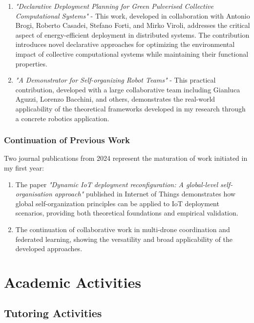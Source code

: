 \documentclass[runningheads]{llncs}
\begin{document}
\begin{enumerate}
\item \textit{"Declarative Deployment Planning for Green Pulverised Collective Computational Systems"} - This work, developed in collaboration with Antonio Brogi, Roberto Casadei, Stefano Forti, and Mirko Viroli, addresses the critical aspect of energy-efficient deployment in distributed systems. The contribution introduces novel declarative approaches for optimizing the environmental impact of collective computational systems while maintaining their functional properties.

\item \textit{"A Demonstrator for Self-organizing Robot Teams"} - This practical contribution, developed with a large collaborative team including Gianluca Aguzzi, Lorenzo Bacchini, and others, demonstrates the real-world applicability of the theoretical frameworks developed in my research through a concrete robotics application.
\end{enumerate}

\subsubsection{Continuation of Previous Work}

Two journal publications from 2024 represent the maturation of work initiated in my first year:

\begin{enumerate}
\item The paper \textit{"Dynamic IoT deployment reconfiguration: A global-level self-organisation approach"} published in Internet of Things demonstrates how global self-organization principles can be applied to IoT deployment scenarios, providing both theoretical foundations and empirical validation.

\item The continuation of collaborative work in multi-drone coordination and federated learning, showing the versatility and broad applicability of the developed approaches.
\end{enumerate}

\section{Academic Activities}

\subsection{Tutoring Activities}
\end{document}
